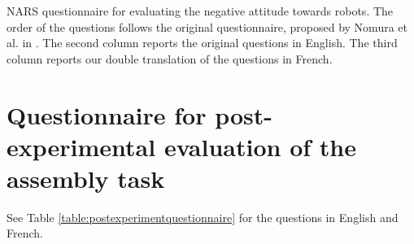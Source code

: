 \documentclass[twocolumn]{svjour3}          %
\begin{document}
\begin{table}
\caption{NARS questionnaire for evaluating the negative attitude towards robots. The order of the questions follows the original questionnaire, proposed by Nomura et al. in \cite{Nomura2006nars}. The second column reports the original questions in English. The third column reports our double translation of the questions in French.}
\label{table:nars}
\end{table}



\section{Questionnaire for post-experimental evaluation of the assembly task}\label{appendix:postexpquestionnaire}

See Table \ref{table:postexperimentquestionnaire} for the questions in English and French.
\end{document}

